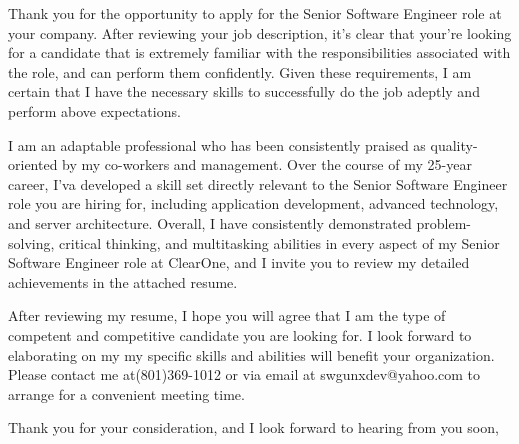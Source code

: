 \documentclass[11pt, a4paper]{awesome-cv}
\begin{document}
\makecvheader

\makelettertitle

\begin{cvletter}
Thank you for the opportunity to apply for the Senior Software Engineer role at your company. After reviewing your job description, it's clear that your're looking for a candidate that is extremely familiar with the responsibilities associated with the role, and can perform them confidently. Given these requirements, I am certain that I have the necessary skills to successfully do the job adeptly and perform above expectations.

I am an adaptable professional who has been consistently praised as quality-oriented by my co-workers and management. Over the course of my 25-year career, I'va developed a skill set directly relevant to the Senior Software Engineer  role you are hiring for, including application development, advanced technology, and server architecture. Overall, I have consistently demonstrated problem-solving, critical thinking, and multitasking abilities in every aspect of my Senior Software Engineer role at ClearOne, and I invite you to review my detailed achievements in the attached resume.


After reviewing my resume, I hope you will agree that I am the type of competent and competitive candidate you are looking for. I look forward to elaborating on my my specific skills and abilities will benefit your organization. Please contact me at(801)369-1012 or via email at swgunxdev@yahoo.com to arrange for a convenient meeting time.

Thank you for your consideration, and I look forward to hearing from you soon,

\end{cvletter}

\makeletterclosing
\end{document}
